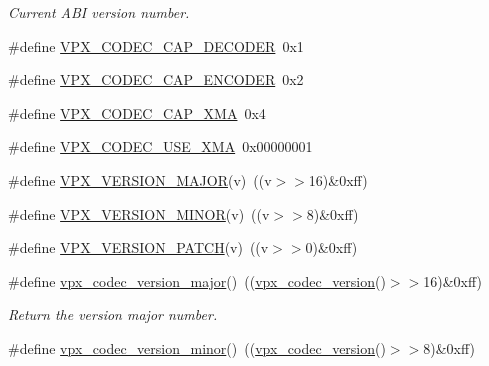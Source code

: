 \begin{DoxyCompactItemize}
\begin{DoxyCompactList}\small\item\em Current A\+B\+I version number. \end{DoxyCompactList}\item 
\#define \hyperlink{group__codec_gae10ad7f9548170aef77df09d48ad108a}{V\+P\+X\+\_\+\+C\+O\+D\+E\+C\+\_\+\+C\+A\+P\+\_\+\+D\+E\+C\+O\+D\+E\+R}~0x1
\item 
\#define \hyperlink{group__codec_gab2e8b76fff95ebd573a17bdc11f8a441}{V\+P\+X\+\_\+\+C\+O\+D\+E\+C\+\_\+\+C\+A\+P\+\_\+\+E\+N\+C\+O\+D\+E\+R}~0x2
\item 
\#define \hyperlink{group__codec_gadbaf864317eb8294fd518862a1e6f9d4}{V\+P\+X\+\_\+\+C\+O\+D\+E\+C\+\_\+\+C\+A\+P\+\_\+\+X\+M\+A}~0x4
\item 
\#define \hyperlink{group__codec_gab363c255f13717f693762c3dcf0b93d6}{V\+P\+X\+\_\+\+C\+O\+D\+E\+C\+\_\+\+U\+S\+E\+\_\+\+X\+M\+A}~0x00000001
\item 
\#define \hyperlink{group__codec_gadebddd67347fe47c0772b1e06b6173ba}{V\+P\+X\+\_\+\+V\+E\+R\+S\+I\+O\+N\+\_\+\+M\+A\+J\+O\+R}(v)~((v$>$$>$16)\&0xff)
\item 
\#define \hyperlink{group__codec_ga4a5ce4588576306dee0d95e8f8706f86}{V\+P\+X\+\_\+\+V\+E\+R\+S\+I\+O\+N\+\_\+\+M\+I\+N\+O\+R}(v)~((v$>$$>$8)\&0xff)
\item 
\#define \hyperlink{group__codec_ga4acf2cf4c35ff123d17cd67c069fdbaa}{V\+P\+X\+\_\+\+V\+E\+R\+S\+I\+O\+N\+\_\+\+P\+A\+T\+C\+H}(v)~((v$>$$>$0)\&0xff)
\item 
\hypertarget{group__codec_gaf314b746e4e202045e85ac073c29a495}{\#define \hyperlink{group__codec_gaf314b746e4e202045e85ac073c29a495}{vpx\+\_\+codec\+\_\+version\+\_\+major}()~((\hyperlink{group__codec_ga163037ae037ac760da65e4130c7d4767}{vpx\+\_\+codec\+\_\+version}()$>$$>$16)\&0xff)}\label{group__codec_gaf314b746e4e202045e85ac073c29a495}

\begin{DoxyCompactList}\small\item\em Return the version major number. \end{DoxyCompactList}\item 
\hypertarget{group__codec_ga2b668688a7d1551ea89bcda8f2587f93}{\#define \hyperlink{group__codec_ga2b668688a7d1551ea89bcda8f2587f93}{vpx\+\_\+codec\+\_\+version\+\_\+minor}()~((\hyperlink{group__codec_ga163037ae037ac760da65e4130c7d4767}{vpx\+\_\+codec\+\_\+version}()$>$$>$8)\&0xff)}\label{group__codec_ga2b668688a7d1551ea89bcda8f2587f93}


\end{DoxyCompactItemize}
